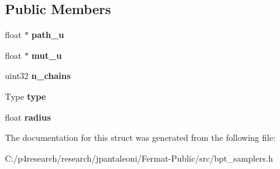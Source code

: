 \subsection*{Public Members}
\begin{DoxyCompactItemize}
\item 
\mbox{\label{struct_perturbed_primary_coords_af8518880c5c9a630f84ce70af7dd986f}} 
float $\ast$ {\bfseries path\+\_\+u}
\item 
\mbox{\label{struct_perturbed_primary_coords_a3a086d65a10fdcf1996586d618731dc2}} 
float $\ast$ {\bfseries mut\+\_\+u}
\item 
\mbox{\label{struct_perturbed_primary_coords_aafe430370b8692648c5c7e7ff110be6c}} 
uint32 {\bfseries n\+\_\+chains}
\item 
\mbox{\label{struct_perturbed_primary_coords_adc1a077d19c2ed1552c4846e6906527a}} 
Type {\bfseries type}
\item 
\mbox{\label{struct_perturbed_primary_coords_a62c1c9ed571a359efb473ace671d6ee0}} 
float {\bfseries radius}
\end{DoxyCompactItemize}


The documentation for this struct was generated from the following file\+:\begin{DoxyCompactItemize}
\item 
C\+:/p4research/research/jpantaleoni/\+Fermat-\/\+Public/src/bpt\+\_\+samplers.\+h\end{DoxyCompactItemize}
